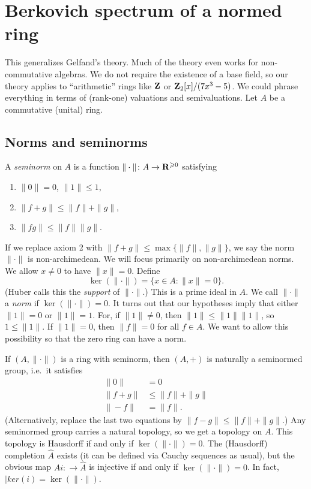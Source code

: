 




\section{Berkovich spectrum of a normed ring}

This generalizes Gelfand's theory. Much of the theory even works for 
non-commutative algebras. We do not require the existence of a base field, so 
our theory applies to ``arithmetic'' rings like $\mathbf{Z}$ or 
$\mathbf{Z}_2[x]/(7 x^3-5)$. 
We could phrase everything in terms of (rank-one) valuations and semivaluations.
Let $A$ be a commutative (unital) ring. 


\subsection{Norms and seminorms}

\begin{definition}
A \emph{seminorm} on $A$ is a function $\|\cdot\|\colon A\to \mathbf{R}^{\geqslant 0}$ 
satisfying 
\begin{enumerate}
\item
$\|0\|=0$, $\|1\|\leqslant 1$, 

\item
$\|f+g\|\leqslant \|f\|+\|g\|$, 

\item
$\|f g\| \leqslant \|f\| \|g\|$. 
\end{enumerate}
\end{definition}

If we replace axiom 2 with $\|f+g\| \leqslant \max\{\|f\|,\|g\|\}$, we say the 
norm $\|\cdot\|$ is non-archimedean. We will focus primarily on non-archimedean 
norms. We allow $x\ne 0$ to have $\|x\|=0$. Define 
\[
  \ker(\|\cdot\|) = \{x\in A\colon \|x\| = 0\} .
\]
(Huber calls this the \emph{support} of $\|\cdot\|$.) This is a prime ideal in 
$A$. We call $\|\cdot\|$ a \emph{norm} if $\ker(\|\cdot\|)=0$. It turns out 
that our hypotheses imply that either $\|1\|=0$ or $\|1\|=1$. For, if 
$\|1\|\ne 0$, then $\|1\| \leqslant \|1\|\|1\|$, so $1\leqslant \|1\|$. If 
$\|1\|=0$, then $\|f\|=0$ for all $f\in A$. We want to allow this possibility 
so that the zero ring can have a norm. 

If $(A,\|\cdot\|)$ is a ring with seminorm, then $(A,+)$ is naturally a 
seminormed group, i.e.~it satisfies 
\begin{align*}
  \|0\| &=0 \\
  \|f+g\| &\leqslant \|f\|+\|g\| \\
  \|-f\| &= \|f\| .
\end{align*}
(Alternatively, replace the last two equations by 
$\|f-g\| \leqslant \|f\|+\|g\|$.) Any seminormed group carries a natural 
topology, so we get a topology on $A$. This topology is Hausdorff if and only 
if $\ker(\|\cdot\|)=0$. The (Hausdorff) completion $\widehat A$ exists (it can 
be defined via Cauchy sequences as usual), but the obvious map 
$Ai\colon\to \widehat A$ is injective if and only if $\ker(\|\cdot\|)=0$. In 
fact, $|ker(i)=\ker(\|\cdot\|)$. 

